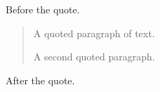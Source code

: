 Before the quote.

\begin{quote}
A quoted paragraph of text.

A second quoted paragraph.
\end{quote}

After the quote.
